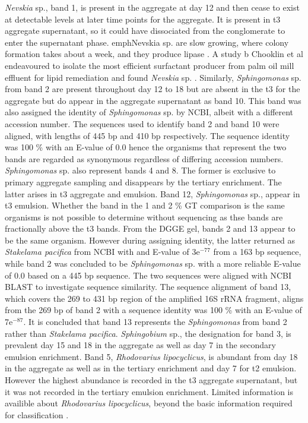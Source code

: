 \documentclass[11pt]{article}
\begin{document}
\emph{Nevskia} sp., band 1, is present in the aggregate at day 12 and then cease to exist at detectable levels at later time points for the aggregate. It is present in t3 aggregate supernatant, so it could have dissociated from the conglomerate to enter the supernatant phase. emph{Nevskia} sp. are slow growing, where colony formation takes about a week, and they produce lipase \cite{kim2011nevskia}. A study b Chooklin et al endeavoured to isolate the most efficient surfactant producer from palm oil mill effluent for lipid remediation and found \emph{Nevskia} sp. \cite{chooklinutilization}.
Similarly, \emph{Sphingomonas} sp. from band 2 are present throughout day 12 to 18 but are absent in the t3 for the aggregate but do appear in the aggregate supernatant as band 10. This band was also assigned the identity of \emph{Sphingomonas} sp. by NCBI, albeit with a different accession number. The sequences used to identify band 2 and band 10 were aligned, with lengths of 445 bp and 410 bp respectively. The sequence identity was 100 \% with an E-value of 0.0 hence the organisms that represent the two bands are regarded as synonymous regardless of differing accession numbers.
\emph{Sphingomonas} sp. also represent bands 4 and 8. The former is exclusive to primary aggregate sampling and disappears by the tertiary enrichment. The latter arises in t3 aggregate and emulsion.
Band 12, \emph{Sphingomonas} sp., appear in t3 emulsion. Whether the band in the 1 and 2 \% GT comparison is the same organisms is not possible to determine without sequencing as thse bands are fractionally above the t3 bands.
From the DGGE gel, bands 2 and 13 appear to be the same organism. However during assigning identity, the latter returned as \emph{Stakelama pacifica} from NCBI with and E-value of 3e$^{-77}$ from a 163 bp sequence, while band 2 was concluded to be \emph{Sphingomonas} sp. with a more reliable E-value of 0.0 based on a 445 bp sequence. The two sequences were aligned with NCBI BLAST to investigate sequence similarity. The sequence alignment of band 13, which covers the 269 to 431 bp region of the amplified 16S rRNA fragment, aligns from the 269 bp of band 2 with a sequence identity was 100 \% with an E-value of 7e$^{-87}$. It is concluded that band 13 represents the \emph{Sphingomonas} from band 2 rather than \emph{Stakelama pacifica}.
\emph{Sphingobium} sp., the designation for band 3, is prevalent day 15 and 18 in the aggregate as well as day 7 in the secondary emulsion enrichment.
Band 5, \emph{Rhodovarius lipocyclicus}, is abundant from day 18 in the aggregate as well as in the tertiary enrichment and day 7 for t2 emulsion. However the highest abundance is recorded in the t3 aggregate supernatant, but it was not recorded in the tertiary emulsion enrichment. Limited information is availible about \emph{Rhodovarius lipocyclicus}, beyond the basic information required for classification \cite{kampfer2004rhodovarius}.
\end{document}
